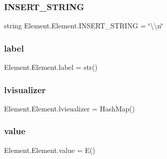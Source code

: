 \hypertarget{class_element_1_1_element_a346648cd57ba439d8b4913a645ab81ba}{}\label{class_element_1_1_element_a346648cd57ba439d8b4913a645ab81ba} 
\subsubsection{\texorpdfstring{I\+N\+S\+E\+R\+T\+\_\+\+S\+T\+R\+I\+NG}{INSERT\_STRING}}
{\footnotesize\ttfamily string Element.\+Element.\+I\+N\+S\+E\+R\+T\+\_\+\+S\+T\+R\+I\+NG = \char`\"{}\textbackslash{}\textbackslash{}n\char`\"{}\hspace{0.3cm}{\ttfamily [static]}}

\hypertarget{class_element_1_1_element_a1eaadb79747dd83097612cac742976fa}{}\label{class_element_1_1_element_a1eaadb79747dd83097612cac742976fa} 
\subsubsection{\texorpdfstring{label}{label}}
{\footnotesize\ttfamily Element.\+Element.\+label = str()\hspace{0.3cm}{\ttfamily [static]}}

\hypertarget{class_element_1_1_element_a130630f8ecfe9255c9e0a514949be201}{}\label{class_element_1_1_element_a130630f8ecfe9255c9e0a514949be201} 
\subsubsection{\texorpdfstring{lvisualizer}{lvisualizer}}
{\footnotesize\ttfamily Element.\+Element.\+lvisualizer = Hash\+Map()\hspace{0.3cm}{\ttfamily [static]}}

\hypertarget{class_element_1_1_element_ae9c30f7574a4356686d93e4567cf61f8}{}\label{class_element_1_1_element_ae9c30f7574a4356686d93e4567cf61f8} 
\subsubsection{\texorpdfstring{value}{value}}
{\footnotesize\ttfamily Element.\+Element.\+value = E()\hspace{0.3cm}{\ttfamily [static]}}

